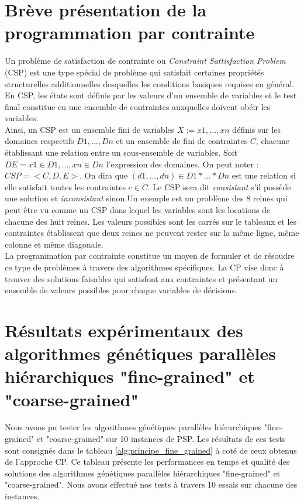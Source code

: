 \documentclass[12pt,a4paper]{article}
\begin{document}
	\section{Brève présentation de la programmation par contrainte}	
	Un problème de satisfaction de contrainte ou \emph{Constraint Sattisfaction Problem} (CSP) est une type spécial de problème qui satisfait certaines propriétés structurelles additionnelles desquelles les conditions basiques requises en général. En CSP, les états sont définis par les valeurs d'un ensemble de variables et le test final constitue en une ensemble de contraintes auxquelles doivent obéir les variables. \\
	\hspace*{.5cm} Ainsi, un CSP est un ensemble fini de variables $X := x1,...,xn$ définis sur les domaines respectifs $D1,...,Dn$ et un ensemble de fini de contraintes $C$, chacune établissant une relation entre un sous-ensemble de variables. Soit $DE = x1 \in D1,..., xn \in Dn$ l'expression des domaines. On peut noter : $CSP = <C,D,E>$. On dira que $(d1,...,dn) \in D1*...*Dn$ est une relation si elle satisfait toutes les contraintes $c \in C$. Le CSP sera dit \emph{consistant} s'il possède une solution et \emph{inconsistant} sinon.Un exemple est un problème des 8 reines qui peut être vu comme un CSP dans lequel les variables sont les locations de chacune des huit reines. Les valeurs possibles sont les carrés sur le tableaux et les contraintes établissent que deux reines ne peuvent rester sur la même ligne, même colonne et même diagonale. \\
	\hspace*{.5cm} La programmation par contrainte constitue un moyen de formuler et de résoudre ce type de problèmes à travers des algorithmes spécifiques. La CP vise donc à trouver des solutions faisables qui satisfont aux contraintes et présentant un ensemble de valeurs possibles pour chaque variables de décisions.
		
		\section{Résultats expérimentaux des algorithmes génétiques parallèles hiérarchiques "fine-grained" et "coarse-grained"}
		Nous avons pu tester les algorithmes génétiques parallèles hiérarchiques "fine-grained" et "coarse-grained" sur 10 instances de PSP. Les résultats de ces tests sont consignés dans le tableau \ref{alg:principe_fine_grained} à coté de ceux obtenus de l'approche CP. Ce tableau présente les performances en temps et qualité des solutions des algorithmes génétiques parallèles hiérarchiques "fine-grained" et "coarse-grained". Nous avons effectué nos tests à travers 10 essais sur chacune des instances.
		
\end{document}
